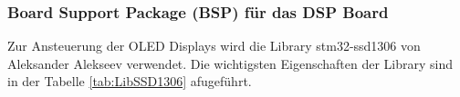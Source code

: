 \subsubsection{Board Support Package (BSP) für das DSP Board}
\label{sec:LibBSP}

Zur Ansteuerung der OLED Displays wird die Library stm32-ssd1306 von Aleksander Alekseev \cite{github-stm32-ssd1306} verwendet. Die wichtigsten Eigenschaften der Library sind in der Tabelle \ref{tab:LibSSD1306} afugeführt.

